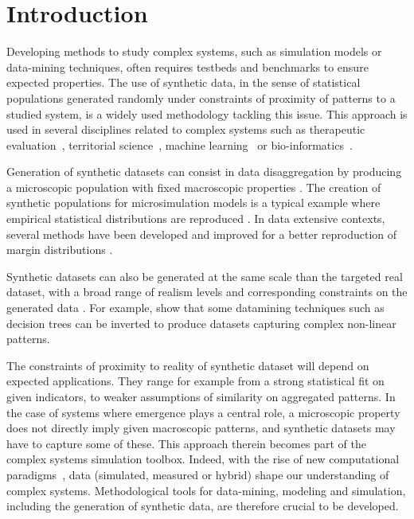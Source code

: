 \documentclass{bmcart}
\begin{document}
\section*{Introduction}


Developing methods to study complex systems, such as simulation models or data-mining techniques, often requires testbeds and benchmarks to ensure expected properties. The use of synthetic data, in the sense of statistical populations generated randomly under constraints of proximity of patterns to a studied system, is a widely used methodology tackling this issue. This approach is used in several disciplines related to complex systems such as therapeutic evaluation~\cite{abadie2010synthetic}, territorial science~\cite{moeckel2003creating,pritchard2009advances}, machine learning~\cite{bolon2013review} or bio-informatics~\cite{van2006syntren}.

Generation of synthetic datasets can consist in data disaggregation by producing a microscopic population with fixed macroscopic properties \cite{beckman1996creating}. The creation of synthetic populations for microsimulation models is a typical example where empirical statistical distributions are reproduced \cite{muller2010population}. In data extensive contexts, several methods have been developed and improved for a better reproduction of margin distributions \cite{barthelemy2013synthetic}.

Synthetic datasets can also be generated at the same scale than the targeted real dataset, with a broad range of realism levels and corresponding constraints on the generated data \cite{hoag2008synthetic}. For example, \cite{eno2008generating} show that some datamining techniques such as decision trees can be inverted to produce datasets capturing complex non-linear patterns.

The constraints of proximity to reality of synthetic dataset will depend on expected applications. They range for example from a strong statistical fit on given indicators, to weaker assumptions of similarity on aggregated patterns. In the case of systems where emergence plays a central role, a microscopic property does not directly imply given macroscopic patterns, and synthetic datasets may have to capture some of these. This approach therein becomes part of the complex systems simulation toolbox. Indeed, with the rise of new computational paradigms~\cite{arthur2015complexity}, data (simulated, measured or hybrid) shape our understanding of complex systems. Methodological tools for data-mining, modeling and simulation, including the generation of synthetic data, are therefore crucial to be developed.
\end{document}
